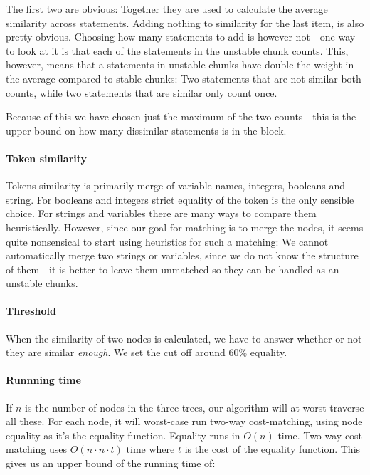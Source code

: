 \documentclass[11pt]{article}
\begin{document}
The first two are obvious: Together they are used to calculate the average similarity across statements. Adding nothing to similarity for the last item, is also pretty obvious. Choosing how many statements to add is however not - one way to look at it is that each of the statements in the unstable chunk counts. This, however, means that a statements in unstable chunks have double the weight in the average compared to stable chunks: Two statements that are not similar both counts, while two statements that are similar only count once.

Because of this we have chosen just the maximum of the two counts - this is the upper bound on how many dissimilar statements is in the block.

\paragraph{Token similarity} Tokens-similarity is primarily merge of variable-names, integers, booleans and string. For booleans and integers strict equality of the token is the only sensible choice. For strings and variables there are many ways to compare them heuristically. However, since our goal for matching is to merge the nodes, it seems quite nonsensical to start using heuristics for such a matching: We cannot automatically merge two strings or variables, since we do not know the structure of them - it is better to leave them unmatched so they can be handled as an unstable chunks.

\paragraph{Threshold} When the similarity of two nodes is calculated, we have to answer whether or not they are similar \textit{enough}. We set the cut off around 60\% equality.


\paragraph{Runnning time} If $n$ is the number of nodes in the three trees, our algorithm will at worst traverse all these. For each node, it will worst-case run two-way cost-matching, using node equality as it's the equality function. Equality runs in $O(n)$ time. Two-way cost matching uses $O(n \cdot n \cdot t)$ time where $t$ is the cost of the equality function.   This gives us an upper bound of the running time of:
\end{document}
